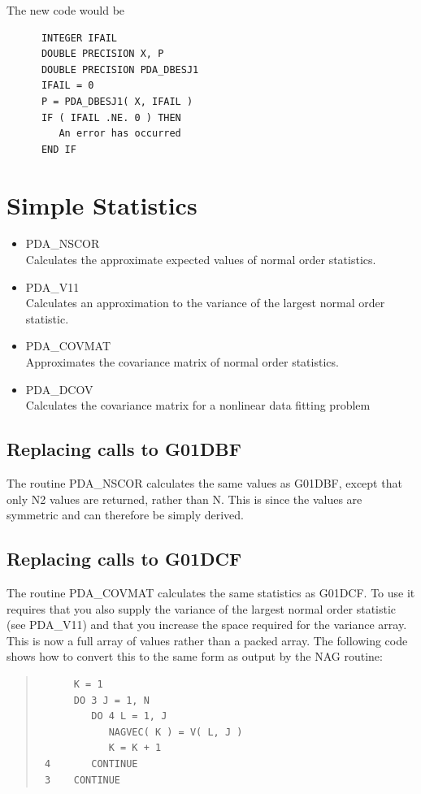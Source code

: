 \documentclass[11pt,twoside]{article}
\newcommand{\htmlref}[2]{#1}
\newcommand{\xlabel}[1]{}
\begin{document}
   The new code would be

\begin{verbatim}
      INTEGER IFAIL
      DOUBLE PRECISION X, P
      DOUBLE PRECISION PDA_DBESJ1
      IFAIL = 0
      P = PDA_DBESJ1( X, IFAIL )
      IF ( IFAIL .NE. 0 ) THEN
         An error has occurred
      END IF
\end{verbatim}

\section{\xlabel{simple_statistics}Simple Statistics}
\begin{itemize}
   \item \htmlref{PDA\_NSCOR}{PDA\_NSCOR} \\
         Calculates the approximate expected values of normal order statistics.
   \item \htmlref{PDA\_V11}{PDA\_V11} \\
         Calculates an approximation to the variance of the largest
         normal order statistic.
   \item \htmlref{PDA\_COVMAT}{PDA\_COVMAT} \\
         Approximates the covariance matrix of normal order statistics.
   \item \htmlref{PDA\_DCOV}{PDA\_DCOV} \\
    Calculates the covariance matrix for a nonlinear data fitting problem
\end{itemize}

\subsection{\xlabel{replacing_calls_to_g01dbf}Replacing calls to G01DBF}
The routine PDA\_NSCOR calculates the same values as G01DBF, except
that only N2 values are returned, rather than N. This is since the
values are symmetric and can therefore be simply derived.

\subsection{\xlabel{replacing_calls_to_g01dcf}Replacing calls to G01DCF}
The routine PDA\_COVMAT calculates the same statistics as G01DCF. To
use it requires that you also supply the variance of the largest
normal order statistic (see PDA\_V11) and that you increase the space
required for the variance array. This is now a full array of values
rather than a packed array. The following code shows how to convert 
this to the same form as output by the NAG routine:
\begin{quote}
\begin{verbatim}
      K = 1
      DO 3 J = 1, N
         DO 4 L = 1, J
            NAGVEC( K ) = V( L, J )
            K = K + 1
 4       CONTINUE
 3    CONTINUE
\end{verbatim}
\end{quote}
\end{document}
